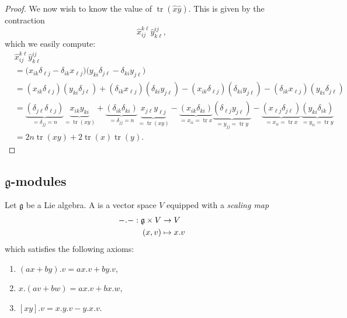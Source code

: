 \documentclass{article}
\newcommand*\wc{{\mkern 0.5mu-\mkern 0.5mu}}
\newcommand{\lb}[1]{\ensuremath{\left[{#1}\right]}}
\DeclareMathOperator{\tr}{tr}
\newcommand*\frkg{{\ensuremath{\mathfrak{g}}}}
\begin{document}
\begin{proof}
    We now wish to know the value of $\tr (\hat{x} \hat{y})$.
    This is given by the contraction
    \[
        \hat{x}_{ij}^{k\ell}\hat{y}_{k\ell}^{ij},
    \]
    which we easily compute:
    \begin{align*}
        &\hat{x}_{ij}^{k\ell}\hat{y}_{k\ell}^{ij}
        \\
        &=
        \Big(
            x_{ik}\delta_{\ell j}
            -
            \delta_{ik}x_{\ell j}
        \Big)
        \Big(
            y_{ki}\delta_{j\ell}
            -
            \delta_{ki}y_{j\ell}
        \Big)
        \\
        &=
        (x_{ik}\delta_{\ell j})(y_{ki}\delta_{j\ell})
        +
        (\delta_{ik}x_{\ell j})(\delta_{ki}y_{j\ell})
        -
        (x_{ik}\delta_{\ell j})(\delta_{ki}y_{j\ell})
        -
        (\delta_{ik}x_{\ell j})(y_{ki}\delta_{j \ell})
        \\
        &=
        \underbrace{
            (\delta_{j\ell}\delta_{\ell j})
        }_{=\delta_{jj}=n}
        \underbrace{
            x_{ik}y_{ki}
        }_{=\tr(xy)}
        +
        \underbrace{
            (\delta_{ik}\delta_{ki})
        }_{=\delta_{jj}=n}
        \underbrace{
            x_{j\ell}y_{\ell j}
        }_{=\tr(xy)}
        -
        \underbrace{
            (x_{ik}\delta_{ki})
        }_{=x_{ii}=\tr x}
        \underbrace{
            (\delta_{\ell j}y_{j\ell})
        }_{=y_{jj}=\tr y}
        -
        \underbrace{
            (x_{\ell j}\delta_{j\ell})
        }_{=x_{ii}=\tr x}
        \underbrace{
            (y_{ki}\delta_{ik})
        }_{=y_{ii}=\tr y}
        \\
        &=
        2n\tr(xy) + 2\tr(x)\tr(y).
    \end{align*}
\end{proof}

\subsection{\texorpdfstring{$\frkg$}{g}-modules}

\begin{definition}
    Let $\frkg$ be a Lie algebra.
    A \defstyle{$\frkg$-module} is a vector space $V$ equipped with a \textit{scaling map}
    \begin{align*}
        \wc . \wc:
        \frkg \times V
        &\to
        V
        \\
        (x, v)
        &\mapsto
        x.v
    \end{align*}
    which satisfies the following axioms:
    \begin{enumerate}[label=(M\arabic*)]
        \item \label{ax:ModuleLeftDistribute}
            $(ax + by).v  = ax.v + by.v$,
        \item \label{ax:ModuleRightDistribute}
            $x.(av + bw) = ax.v + bx.w$,
        \item \label{ax:ModuleBracket}
            $\lb{xy}.v = x.y.v - y.x.v$.
    \end{enumerate}

\end{definition}
\end{document}

